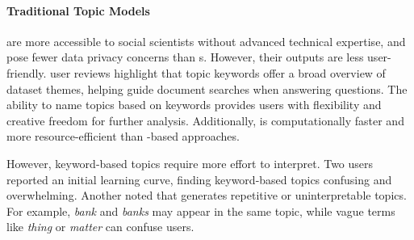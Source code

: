 \paragraph{Traditional Topic Models} 
are 
more accessible to social scientists without advanced technical expertise, and pose fewer data privacy concerns than \mm{}s. However, their outputs are less user-friendly.
%
\lda{} user reviews highlight that topic keywords offer a broad overview of dataset themes, helping guide document searches when answering questions. 
%
The ability to name topics based on keywords provides users with flexibility and creative freedom for further analysis.
%
Additionally,  is computationally faster and more resource-efficient than \mm{}-based approaches.

However, keyword-based topics 
require more effort to interpret.
%
%
%
Two users reported an initial learning curve, finding keyword-based topics confusing and overwhelming. Another noted that \lda{} generates repetitive or uninterpretable topics. For example, \textit{bank} and \textit{banks} may appear in the same topic, while vague terms like \textit{thing} or \textit{matter} can confuse users.


